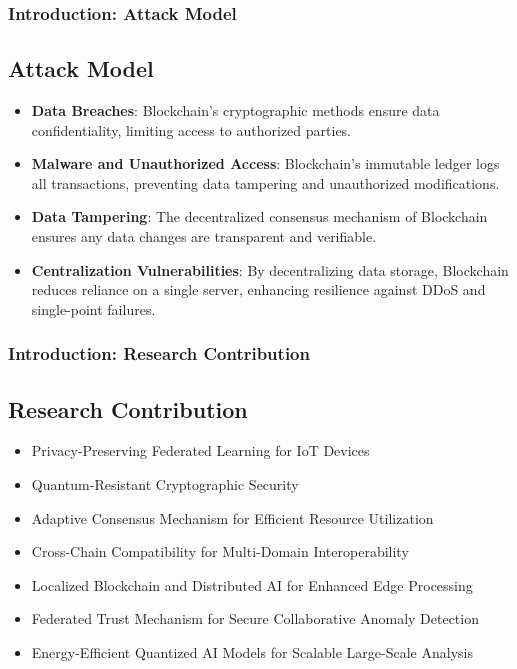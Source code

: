 \documentclass [xcolor=svgnames] {beamer}
\begin{document}
\begin{frame}
\normalsize
\frametitle{Introduction: Attack Model}
\subsection{Attack Model}

\begin{itemize}
\item \textbf{Data Breaches}: Blockchain’s cryptographic methods ensure data confidentiality, limiting access to authorized parties.

\item \textbf{Malware and Unauthorized Access}: Blockchain’s immutable ledger logs all transactions, preventing data tampering and unauthorized modifications.

\item \textbf{Data Tampering}: The decentralized consensus mechanism of Blockchain ensures any data changes are transparent and verifiable.

\item \textbf{Centralization Vulnerabilities}: By decentralizing data storage, Blockchain reduces reliance on a single server, enhancing resilience against DDoS and single-point failures.
\end{itemize}

\end{frame}


\begin{frame}
\normalsize
\frametitle{Introduction: Research Contribution}
\subsection{Research Contribution}
\begin{itemize}

\item Privacy-Preserving Federated Learning for IoT Devices
\item Quantum-Resistant Cryptographic Security
\item Adaptive Consensus Mechanism for Efficient Resource Utilization
\item Cross-Chain Compatibility for Multi-Domain Interoperability
\item Localized Blockchain and Distributed AI for Enhanced Edge Processing
\item Federated Trust Mechanism for Secure Collaborative Anomaly Detection
\item Energy-Efficient Quantized AI Models for Scalable Large-Scale Analysis

\end{itemize}
\end{frame}
\end{document}

